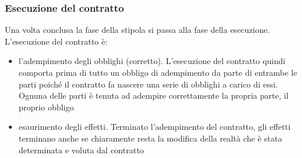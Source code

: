 \subsubsection{Esecuzione del contratto}
Una volta conclusa la fase della stipola si passa alla fase della esecuzione. L'esecuzione del contratto è:
  
\begin{itemize}
    \item l'adempimento degli obblighi (corretto). L'esecuzione del contratto quindi comporta prima di tutto un obbligo di adempimento da parte di entrambe le parti poiché il contratto fa nascere una serie di obblighi a carico di essi. Ognuna delle parti è tenuta ad adempire correttamente la propria parte, il proprio obbligo
    \item esaurimento degli effetti. Terminato l'adempimento del contratto, gli effetti terminano anche se chiaramente resta la modifica della realtà che è stata determinata e voluta dal contratto
\end{itemize}  
  

